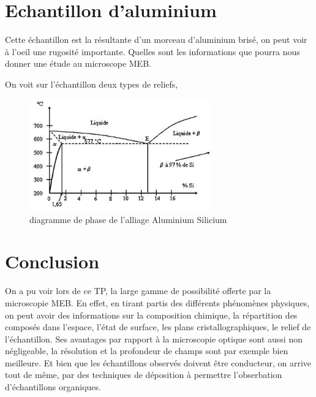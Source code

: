 \documentclass[a4paper,12pt]{article}
\begin{document}
\section{Echantillon d'aluminium}
Cette échantillon est la résultante d'un morceau d'aluminium brisé, on peut voir à l'oeil une rugosité importante. Quelles sont les informations que pourra nous donner une étude au microscope MEB.

On voit sur l'échantillon deux types de reliefs,
\begin{figure}
\centering
\includegraphics[width=0.7\textwidth]{images/diagphasealusi.jpg}
\caption{diagramme de phase de l'alliage Aluminium Silicium}
\label{fig:diagphase}
\end{figure}

\section*{Conclusion}

On a pu voir lors de ce TP, la large gamme de possibilité offerte par la microscopie MEB. En effet, en tirant partis des différents phénomènes physiques, on peut avoir des informations sur la composition chimique, la répartition des composés dans l'espace, l'état de surface, les plans cristallographiques, le relief de l'échantillon. Ses avantages par rapport à la microscopie optique sont aussi non négligeable, la résolution et la profondeur de champs sont par exemple bien meilleure. Et bien que les échantillons observés doivent être conducteur, on arrive tout de même, par des techniques de déposition à permettre l'obserbation d'échantillons organiques.
\end{document}
